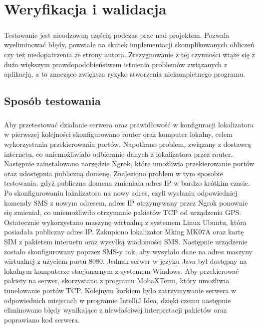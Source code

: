 \chapter{Weryfikacja i walidacja}
\label{ch:06}

\paragraph{}
Testowanie jest nieodzowną częścią podczas prac nad projektem. Pozwala wyeliminować błędy, powstałe na skutek implementacji skomplikowanych obliczeń czy też niedopatrzenia ze strony autora. Zrezygnowanie z tej czynności wiąże się z dużo większym prawdopodobieństwem istnienia problemów związanych z aplikacją, a to znacząco zwiększa ryzyko stworzenia niekompletnego programu.

\section{Sposób testowania}
\paragraph{}
Aby przetestować działanie serwera oraz prawidłowość w konfiguracji lokalizatora w pierwszej kolejności skonfigurowano router oraz komputer lokalny, celem wykorzystania przekierowania portów. Napotkano problem, związany z dostawcą internetu, co uniemożliwiało odbieranie danych z lokalizatora przez router. Następnie zainstalowano narzędzie Ngrok, które umożliwia przekierowanie portów oraz udostępnia publiczną domenę. Znaleziono problem w tym sposobie testowania, gdyż publiczna domena zmieniała adres IP w bardzo krótkim czasie. Po skonfigurowaniu lokalizatora na nowy adres, czyli wysłaniu odpowiedniej komendy SMS z nowym adresem, adres IP otrzymywany przez Ngrok ponownie się zmieniał, co uniemożliwiło otrzymanie pakietów TCP od urządzenia GPS. Ostatecznie wykorzystano maszynę wirtualną z systemem Linux Ubuntu, która posiadała publiczny adres IP. Zakupiono lokalizator Mking MK07A oraz kartę SIM z pakietem internetu oraz wysyłką wiadomości SMS. Następnie urządzenie zostało skonfigurowany poprzez SMS-y tak, aby wysyłało dane na adres maszyny wirtualnej z użyciem portu 8080. Jednak serwer w języku Java był dostępny na lokalnym komputerze stacjonarnym z systemem Windows. Aby przekierować pakiety na serwer, skorzystano z programu MobaXTerm, który umożliwia tunelowanie portów TCP. Kolejnym korkiem było zatrzymywanie serwera w odpowiednich miejscach w programie IntelliJ Idea, dzięki czemu następnie eliminowano błędy wynikające z niewłaściwej interpretacji pakietów oraz poprawiano kod serwera.

